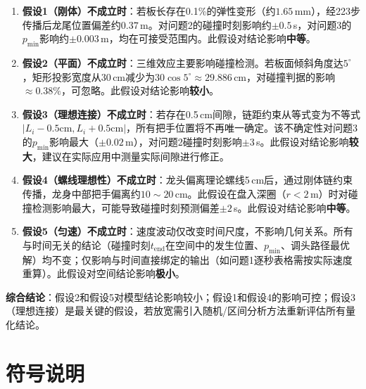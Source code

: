 \documentclass[12pt]{ctexart}
\begin{document}
\begin{enumerate}[label=(\arabic*)]
  \item \textbf{假设1（刚体）不成立时}：若板长存在0.1\%的弹性变形（约$1.65$\,mm），经223步传播后龙尾位置偏差约$0.37$\,m。对问题2的碰撞时刻影响约$\pm 0.5$\,s，对问题3的$p_{\min}$影响约$\pm 0.003$\,m，均在可接受范围内。此假设对结论影响\textbf{中等}。
  \item \textbf{假设2（平面）不成立时}：三维效应主要影响碰撞检测。若板面倾斜角度达$5^\circ$，矩形投影宽度从30\,cm减少为$30\cos 5^\circ\approx 29.886$\,cm，对碰撞判据的影响$\approx 0.38\%$，可忽略。此假设对结论影响\textbf{较小}。
  \item \textbf{假设3（理想连接）不成立时}：若存在0.5\,cm间隙，链距约束从等式变为不等式$|L_i-0.5\text{cm}, L_i+0.5\text{cm}|$，所有把手位置将不再唯一确定。该不确定性对问题3的$p_{\min}$影响最大（$\pm 0.02$\,m），对问题2碰撞时刻影响$\pm 3$\,s。此假设对结论影响\textbf{较大}，建议在实际应用中测量实际间隙进行修正。
  \item \textbf{假设4（螺线理想性）不成立时}：龙头偏离理论螺线5\,cm后，通过刚体链约束传播，龙身中部把手偏离约$10\sim 20$\,cm。此假设在盘入深圈（$r<2$\,m）时对碰撞检测影响最大，可能导致碰撞时刻预测偏差$\pm 2$\,s。此假设对结论影响\textbf{中等}。
  \item \textbf{假设5（匀速）不成立时}：速度波动仅改变时间尺度，不影响几何关系。所有与时间无关的结论（碰撞时刻$t_{\text{end}}$在空间中的发生位置、$p_{\min}$、调头路径最优解）均不变；仅影响与时间直接绑定的输出（如问题1逐秒表格需按实际速度重算）。此假设对空间结论影响\textbf{极小}。
\end{enumerate}

\textbf{综合结论}：假设2和假设5对模型结论影响较小；假设1和假设4的影响可控；假设3（理想连接）是最关键的假设，若放宽需引入随机/区间分析方法重新评估所有量化结论。

\FloatBarrier

\section{符号说明}
\end{document}

